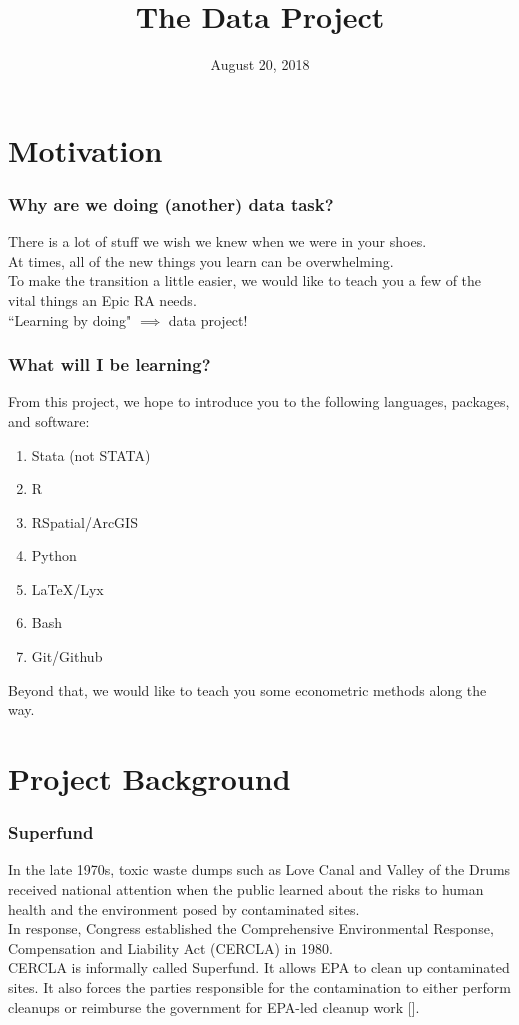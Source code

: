 \documentclass{beamer}
\title[Server]{The Data Project}
\institute{\large{EPIC RA Orientation}}
\date{August 20, 2018}
\newcommand{\be}{\begin{enumerate}}
\newcommand{\ee}{\end{enumerate}}
\begin{document}
\begin{frame}
	\titlepage
\end{frame}

\section{Motivation}
\begin{frame}
\frametitle{Why are we doing (another) data task?}
There is a lot of stuff we wish we knew when we were in your shoes.
\\[1em]\pause
At times, all of the new things you learn can be overwhelming.
\\[1em]\pause
To make the transition a little easier, we would like to teach you a few of the vital things an Epic RA needs.
\\[1em]\pause
``Learning by doing" $\implies$ data project!
\end{frame}

\begin{frame}
\frametitle{What will I be learning?}
From this project, we hope to introduce you to the following languages, packages, and software:
\be
\item Stata (not STATA)
\item R
\item RSpatial/ArcGIS
\item Python
\item \LaTeX/Lyx
\item Bash 
\item Git/Github
\ee

Beyond that, we would like to teach you some econometric methods along the way.
\end{frame}

\section{Project Background}
\begin{frame}
\frametitle{Superfund}
\small{In the late 1970s, toxic waste dumps such as Love Canal and Valley of the Drums received national attention when the public learned about the risks to human health and the environment posed by contaminated sites.
\\[1em]\pause
In response, Congress established the Comprehensive Environmental Response, Compensation and Liability Act (CERCLA) in 1980.
\\[1em]\pause
CERCLA is informally called Superfund. It allows EPA to clean up contaminated sites. It also forces the parties responsible for the contamination to either perform cleanups or reimburse the government for EPA-led cleanup work [\cite{epa}].} 
\end{frame}
\end{document}
